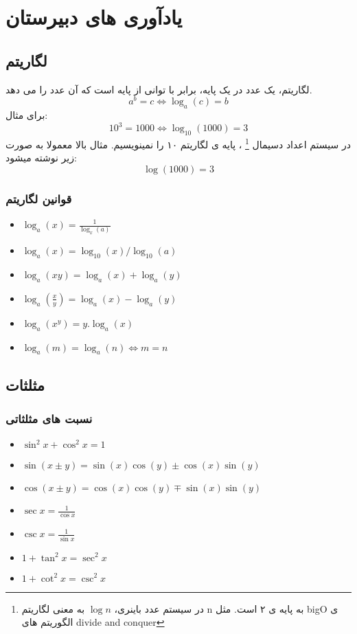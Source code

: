 \documentclass[12pt, a4paper, oneside]{article}
\begin{document}
\newcommand\deltavec[1]{\vec{\Delta{#1}}}
\newcommand\undersetrtl[2]{${\underset{#1}{#2}}$}
\newcommand\fnote[1]{\footnote[\refstepcounter{fnote}]}
\section{یادآوری های دبیرستان}
\subsection{لگاریتم}
\label{subsec:log}
لگاریتم، یک عدد در یک پایه، برابر با توانی از پایه است که آن عدد را می دهد.
\[a^b = c \Leftrightarrow \log_a (c) = b\]
برای مثال: 
\[10^3 = 1000 \Leftrightarrow \log_{10} (1000) = 3\]
در سیستم اعداد دسیمال
\footnote[1]{
    در سیستم عدد باینری، 
    $\log{n}$
    به معنی لگاریتم n به پایه ی ۲ است.
    مثل 
    bigO ی 
    الگوریتم های
    divide and conquer
}
    ، پایه ی لگاریتم ۱۰ را نمینویسیم. مثال بالا معمولا به صورت زیر نوشته میشود: 
    \[\log (1000) = 3\]
\subsubsection{قوانین لگاریتم}

\noindent
\begin{latin}
\begin{itemize}
    \item { $\log_a(x) = \frac{ 1 }{ \log_x(a) }$ }
    \item { $\log_a(x) = \log_{10}(x)/\log_{10}(a)$ }
    \item { $\log_a(xy) = \log_a (x) + \log_a(y)$ }
    \item { $\log_a(\frac{x}{y}) = \log_a (x) - \log_a(y)$ }
    \item { $\log_a(x^y) = y.\log_a(x)$ }
    \item { $\log_a (m) = \log_a(n) \Leftrightarrow m = n$ }
\end{itemize}
\end{latin}

\subsection{مثلثات}
\subsubsection{نسبت های مثلثاتی}
\begin{latin}
\begin{itemize}
    \item $\sin^2x + \cos^2x = 1$
    \item $\sin(x \pm y) = \sin(x)\cos(y) \pm \cos(x)\sin(y)$
    \item $\cos(x \pm y) = \cos(x)\cos(y) \mp \sin(x)\sin(y)$
    \item $\sec x= \frac{1}{\cos x}$
    \item $\csc x= \frac{1}{\sin x}$
    \item $1+\tan^2x = \sec^2x$
    \item $1+\cot^2x = \csc^2x$
\end{itemize}
\end{latin}
\end{document}
